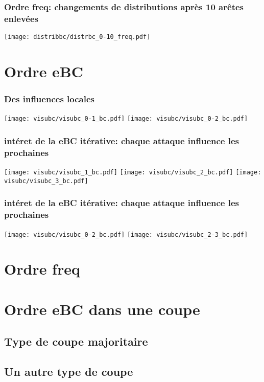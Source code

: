 \documentclass[aspectratio=169]{beamer}
\begin{document}
    \begin{frame}
        \frametitle{Ordre freq: changements de distributions après 10 arêtes enlevées}
        \centering
        \texttt{[image: distribbc/distrbc\_0-10\_freq.pdf]}    
    \end{frame}

    \section{Ordre eBC}

    \begin{frame}
        \frametitle{Des influences locales}
        \texttt{[image: visubc/visubc\_0-1\_bc.pdf]}
        \texttt{[image: visubc/visubc\_0-2\_bc.pdf]}
    \end{frame}

    \begin{frame}
        \centering
        \frametitle{intéret de la eBC itérative: chaque attaque influence les prochaines}
        \texttt{[image: visubc/visubc\_1\_bc.pdf]}
        \texttt{[image: visubc/visubc\_2\_bc.pdf]}
        \texttt{[image: visubc/visubc\_3\_bc.pdf]}
    \end{frame}

    \begin{frame}
        \centering
        \frametitle{intéret de la eBC itérative: chaque attaque influence les prochaines}
        \texttt{[image: visubc/visubc\_0-2\_bc.pdf]}
        \texttt{[image: visubc/visubc\_2-3\_bc.pdf]}
    \end{frame}

    \section{Ordre freq}
   
    \section{Ordre eBC dans une coupe}
    \subsection{Type de coupe majoritaire}
    \subsection{Un autre type de coupe}
    
\end{document}
